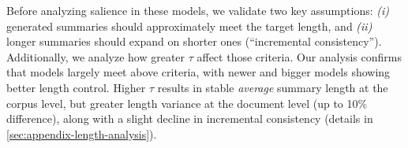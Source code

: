 Before analyzing salience in these models, we validate two key assumptions: \emph{(i)} generated summaries should approximately meet the target length, and \emph{(ii)} longer summaries should expand on shorter ones (``incremental consistency''). Additionally, we analyze how greater $\tau$ affect those criteria.
Our analysis confirms that models largely meet above criteria, with newer and bigger models showing better length control.
Higher $\tau$ results in stable \emph{average} summary length at the corpus level, but greater length variance at the document level (up to 10\% difference), along with a slight decline in incremental consistency (details in \cref{sec:appendix-length-analysis}).
